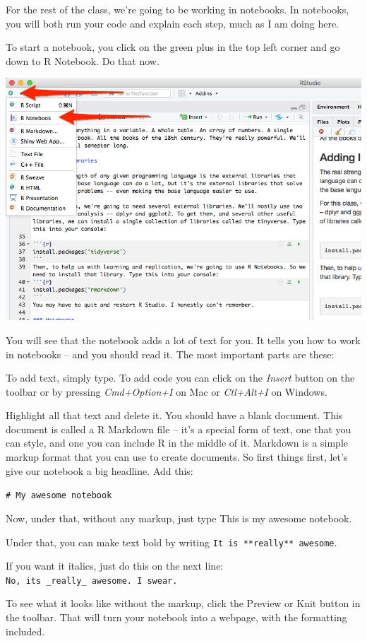 \documentclass[]{book}
\begin{document}
For the rest of the class, we're going to be working in notebooks. In notebooks, you will both run your code and explain each step, much as I am doing here.

To start a notebook, you click on the green plus in the top left corner and go down to R Notebook. Do that now.

\includegraphics[width=11.08in]{images/verybasics2}

You will see that the notebook adds a lot of text for you. It tells you how to work in notebooks -- and you should read it. The most important parts are these:

To add text, simply type. To add code you can click on the \emph{Insert} button on the toolbar or by pressing \emph{Cmd+Option+I} on Mac or \emph{Ctl+Alt+I} on Windows.

Highlight all that text and delete it. You should have a blank document. This document is called a R Markdown file -- it's a special form of text, one that you can style, and one you can include R in the middle of it. Markdown is a simple markup format that you can use to create documents. So first things first, let's give our notebook a big headline. Add this:

\texttt{\#\ My\ awesome\ notebook}

Now, under that, without any markup, just type This is my awesome notebook.

Under that, you can make text bold by writing \texttt{It\ is\ **really**\ awesome}.

If you want it italics, just do this on the next line: \texttt{No,\ it\textquotesingle{}s\ \_really\_\ awesome.\ I\ swear.}

To see what it looks like without the markup, click the Preview or Knit button in the toolbar. That will turn your notebook into a webpage, with the formatting included.
\end{document}
